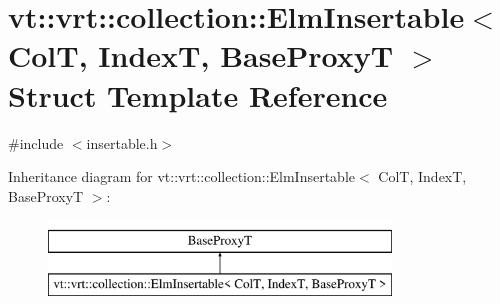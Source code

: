 \hypertarget{structvt_1_1vrt_1_1collection_1_1_elm_insertable}{}\section{vt\+:\+:vrt\+:\+:collection\+:\+:Elm\+Insertable$<$ ColT, IndexT, Base\+ProxyT $>$ Struct Template Reference}
\label{structvt_1_1vrt_1_1collection_1_1_elm_insertable}


{\ttfamily \#include $<$insertable.\+h$>$}

Inheritance diagram for vt\+:\+:vrt\+:\+:collection\+:\+:Elm\+Insertable$<$ ColT, IndexT, Base\+ProxyT $>$\+:\begin{figure}[H]
\begin{center}
\leavevmode
\includegraphics[height=2.000000cm]{structvt_1_1vrt_1_1collection_1_1_elm_insertable}
\end{center}
\end{figure}
